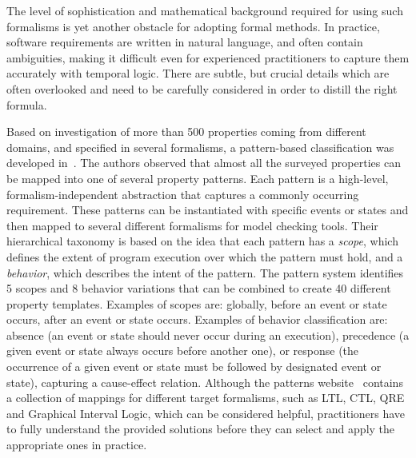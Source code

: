 \documentclass[letter]{llncs}
\begin{document}
The level of sophistication and mathematical background required for using such formalisms is yet another obstacle for adopting formal methods. 
In practice, software requirements are written in natural language, and often contain ambiguities, making it difficult even for experienced 
practitioners to capture them accurately with temporal logic. There are subtle, but crucial details which are often overlooked and 
need to be carefully considered in order to distill the right formula.

Based on investigation of more than 500 properties coming from different domains, and specified in several formalisms, a pattern-based classification
was developed in~\cite{Dwyer:1999:PPS:302405.302672}. The authors observed that almost all the surveyed properties
can be mapped into one of several property patterns. Each pattern is a
high-level, formalism-independent abstraction that captures a
commonly occurring requirement. These patterns can be instantiated with specific
events or states and then mapped to several different formalisms for model
checking tools. Their hierarchical taxonomy is based on the idea that each
pattern has a \emph{scope}, which defines the extent of program execution over
which the pattern must hold, and a \emph{behavior}, which describes the intent of the pattern. The pattern
system identifies 5 scopes and 8 behavior variations that can be
combined to create 40 different property templates. Examples of scopes are: globally,
before an event or state occurs, after an event or state occurs.
Examples of behavior classification are: absence (an event or state should never
occur during an execution), precedence (a given event or
state always occurs before another one), 
or response (the occurrence of a given event or state must be followed by
designated event or state), capturing a cause-effect relation.
Although the patterns website~\cite{PSP} contains a collection of mappings for
different target formalisms, such as LTL, CTL, QRE and Graphical Interval Logic, which can be considered helpful,
practitioners have to fully understand the provided solutions before they can
select and apply the appropriate ones in practice.
\end{document}
